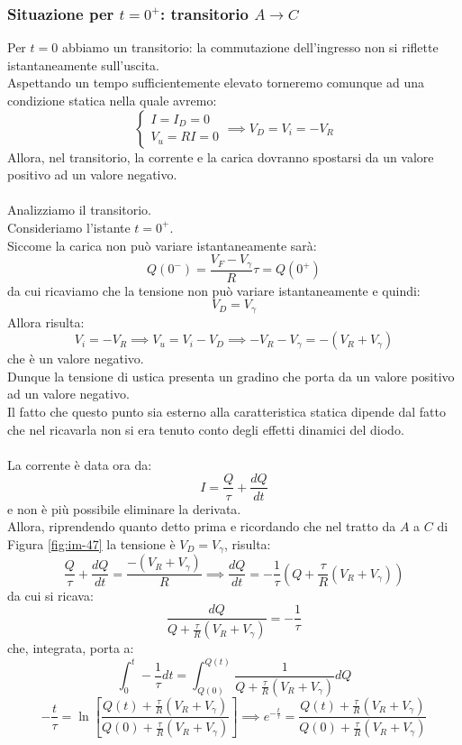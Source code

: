 \documentclass{article}
\numberwithin{equation}{subsection}
\begin{document}
	\subsubsection{Situazione per $t = 0^+$: transitorio $A \rightarrow C$}
	Per $t = 0$ abbiamo un transitorio: la commutazione dell’ingresso non si riflette istantaneamente sull’uscita. \\
	Aspettando un tempo sufficientemente elevato torneremo comunque ad una condizione statica nella quale avremo:
	$$\begin{cases} I = I_D = 0 \\ V_u = RI = 0 \end{cases} \implies V_D = V_i = -V_R$$
	Allora, nel transitorio, la corrente e la carica dovranno spostarsi da un valore positivo ad un valore negativo.\\\\
	Analizziamo il transitorio. \\
	Consideriamo l’istante $t = 0^+$. \\
	Siccome la carica non può variare istantaneamente sarà:
	$$Q(0^-) = \frac{V_F - V_\gamma}{R} \tau = Q(0^+)$$
	da cui ricaviamo che la tensione non può variare istantaneamente e quindi:
	$$V_D = V_\gamma$$
	Allora risulta:
	$$V_i = -V_R \implies V_u = V_i - V_D \implies -V_R - V_\gamma = -(V_R + V_\gamma)$$
	che è un valore negativo. \\
	Dunque la tensione di ustica presenta un gradino che porta da un valore positivo ad un valore negativo. \\
	Il fatto che questo punto sia esterno alla caratteristica statica dipende dal fatto che nel ricavarla non si era tenuto conto degli effetti dinamici del diodo.\\\\
	La corrente è data ora da:
	$$I = \frac{Q}{\tau} + \frac{dQ}{dt}$$
	e non è più possibile eliminare la derivata. \\
	Allora, riprendendo quanto detto prima e ricordando che nel tratto da $A$ a $C$ di Figura \ref{fig:im-47} la tensione è $V_D = V_\gamma$, risulta:
	$$\frac{Q}{\tau} + \frac{dQ}{dt} = \frac{-(V_R + V_\gamma)}{R} \implies \frac{dQ}{dt} = -\frac{1}{\tau} \left( Q + \frac{\tau}{R} (V_R + V_\gamma) \right)$$
	da cui si ricava:
	$$\frac{dQ}{Q + \frac{\tau}{R} (V_R + V_\gamma)} = -\frac{1}{\tau}$$
	che, integrata, porta a:
	$$\int_0^t -\frac{1}{\tau} dt = \int_{Q(0)}^{Q(t)} \frac{1}{Q + \frac{\tau}{R} (V_R + V_\gamma)} dQ$$ $$-\frac{t}{\tau} = \ln \left[ \frac{Q(t) + \frac{\tau}{R} (V_R + V_\gamma)}{Q(0) + \frac{\tau}{R} (V_R + V_\gamma)} \right] \implies e^{-\frac{t}{\tau}} = \frac{Q(t) + \frac{\tau}{R} (V_R + V_\gamma)}{Q(0) + \frac{\tau}{R} (V_R + V_\gamma)}$$
\end{document}
